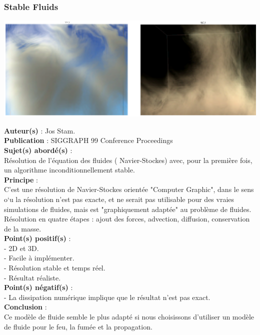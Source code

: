 \documentclass[a4paper,10pt]{article}
\begin{document}
\subsubsection{Stable Fluids}
    \begin{center}
	\includegraphics[scale=0.5]{Stable.ps}
    \end{center}
\textbf{Auteur(s)} : Jos Stam.\\
\textbf{Publication} : SIGGRAPH 99 Conference Proceedings\\
\textbf{Sujet(s) abordé(s)} : \\
Résolution de l'équation des fluides ( Navier-Stockes) avec, pour la première fois, un algorithme inconditionnellement stable.\\
\textbf{Principe} :\\
C'est une résolution de Navier-Stockes orientée "Computer Graphic", dans le sens o`u la résolution n'est pas exacte, et ne serait pas utilisable pour des vraies simulations de fluides, mais est "graphiquement adaptée" au problème de fluides.\\
Résolution en quatre étapes : ajout des forces, advection, diffusion, conservation de la masse.\\
\textbf{Point(s) positif(s)} : \\
- 2D et 3D.\\
- Facile à implémenter.\\
- Résolution stable et temps réel.\\
- Résultat réaliste.\\
\textbf{Point(s) négatif(s)} :\\
- La dissipation numérique implique que le résultat n'est pas exact.\\
\textbf{Conclusion} :\\
Ce modèle de fluide semble le plus adapté si nous choisissons d'utiliser un modèle de fluide pour le feu, la fumée et la propagation.
\end{document}
